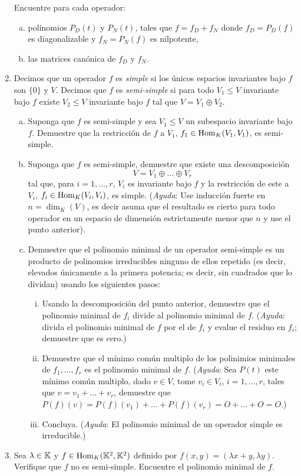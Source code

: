 \begin{enumerate}
      Encuentre para cada operador:
      \begin{enumerate}[(a)]
        \item polinomios $P_D(t)$ y $P_N(t)$, tales que $f=f_D+f_N$ donde $f_D=P_D(f)$ es diagonalizable y $f_N=P_N(f)$ es nilpotente,
        \item las matrices canónica de $f_D$ y $f_N$. 
      \end{enumerate}
    \item Decimos que un operador $f$ es \emph{simple} si los \'unicos espacios invariantes bajo $f$ son $\{0\}$ y $V$. Decimos que $f$ es \emph{semi-simple} si para todo $V_1\le V$ invariante bajo $f$ existe $V_2\le V$ invariante bajo $f$ tal que $V=V_1\oplus V_2$.
      \begin{enumerate}[(a)]
        \item Suponga que $f$ es semi-simple y sea $V_1\le V$ un subespacio invariante bajo $f$. Demuestre que la restricci\'on de $f$ a $V_1$, $f_1\in\operatorname{Hom}_K(V_1,V_1)$, es semi-simple.
        \item Suponga que $f$ es semi-simple, demuestre que existe una descomposici\'on
        \[
        V=V_1\oplus\ldots\oplus V_r
        \]
        tal que, para $i=1,\ldots,r$, $V_i$ es invariante bajo $f$ y la restricci\'on de este a $V_i$, $f_i\in\operatorname{Hom}_K(V_i,V_i)$, es simple. (\emph{Ayuda}: Use inducci\'on fuerte en $n=\dim_K(V)$, es decir asuma que el resultado es cierto para todo operador en un espacio de dimensi\'on estrictamente menor que $n$ y use el punto anterior).
        \item Demuestre que el polinomio minimal de un operador semi-simple es un producto de polinomios irreducibles ninguno de ellos repetido (es decir, elevados \'unicamente a la primera potencia; es decir, sin cuadrados que lo dividan) usando los siguientes pasos:
        \begin{enumerate}[(i)]
          \item Usando la descomposici\'on del punto anterior, demuestre que el polinomio minimal de $f_i$ divide al polinomio minimal de $f$. (\emph{Ayuda}: divida el polinomio minimal de $f$ por el de $f_i$ y evalue el residuo en $f_i$; demuestre que es cero.)
          \item Demuestre que el m\'inimo com\'un multiplo de los polinimios minimales de $f_1,\ldots,f_r$ es el polinomio minimal de $f$. (\emph{Ayuda}: Sea $P(t)$ este m\'inimo com\'un multiplo, dado $v\in V$, tome $v_i\in V_i$, $i=1,\ldots,r$, tales que $v=v_1+\ldots+v_r$, demuestre que $P(f)(v)=P(f)(v_1)+\ldots+P(f)(v_r)=O+\ldots+O=O$.) 
          \item Concluya. (\emph{Ayuda}: El polinomio minimal de un operador simple es irreducible.)
        \end{enumerate} 
      \end{enumerate}
    \item Sea $\lambda\in \mathbb{K}$ y $f\in\operatorname{Hom}_K(\mathbb{K}^2,\mathbb{K}^2)$ definido por $f(x,y)=(\lambda x+y,\lambda y)$. Verifique que $f$ no es semi-simple. Encuentre el polinomio minimal de $f$.
    

\end{enumerate}
